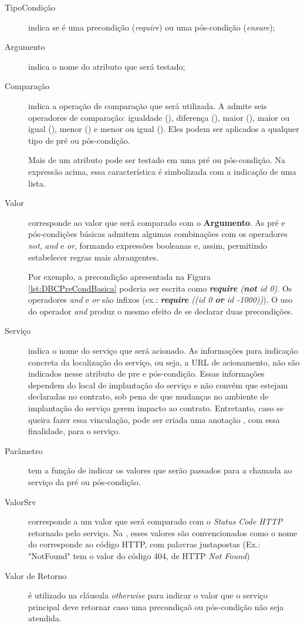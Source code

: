 \begin{description}
\item [TipoCondição] indica se é uma precondição (\emph{require}) ou uma
pós-condição (\emph{ensure});

\item [Argumento] indica o nome do atributo que será testado;

\item [Comparação] indica a operação de comparação que será utilizada. A
\neoidl{}  admite seis operadores de comparação: igualdade (\literal{==}), 
diferença (\literal{<>}), maior (\literal{>}), maior ou igual (\literal{>=}), 
menor (\literal{<}) e menor ou igual (\literal{<=}). Eles podem ser aplicados  a
qualquer tipo de pré ou pós-condição.

Mais de um atributo pode ser testado em uma pré ou pós-condição. Na expressão
acima, essa característica é simbolizada com a indicação de uma lista.

\item [Valor] corresponde ao valor que será comparado com o \textbf{Argumento}.
As pré e pós-condições básicas admitem algumas combinações com os operadores
\emph{not}, \emph{and} e \emph{or}, formando expressões booleanas e,
assim, permitindo estabelecer regras mais abrangentes.

Por exemplo, a precondição apresentada na Figura \ref{lst:DBCPreCondBasica} poderia
ser escrita como \emph{\textbf{require} (\textbf{not} id \literal{<=} 0)}. Os
operadores \emph{and} e \emph{or} são infixos (ex.: \emph{\textbf{require}
((id \literal{>} 0 \textbf{or} id \literal{<=} -1000))}). O uso do operador
\emph{and} produz o mesmo efeito de se declarar duas precondições.

\item [Serviço] indica o nome do serviço que será acionado. As informações para
indicação concreta da localização do serviço, ou seja, a URL de acionamento, não
são indicados nesse atributo de pre e pós-condição. Essas informações dependem
do local de implantação do serviço e não convém que estejam declaradas no
contrato, sob pena de que mudanças no ambiente de implantação do serviço gerem
impacto ao contrato.
Entretanto, caso se queira fazer essa vinculação, pode ser criada uma anotação
\neoidl{}, com essa finalidade, para o serviço.

\item [Parâmetro] tem a função de indicar os valores que serão passados para a
chamada ao serviço da pré ou pós-condição.

 \item [ValorSrv] corresponde a um valor que será comparado com o
 \textit{Status Code HTTP} retornado pelo serviço. Na \neoidl{}, esses valores
 são convencionados como o nome do corresponde ao código HTTP, com palavras
 justapostas (Ex.: "NotFound" tem o valor do código 404, de HTTP \textit{Not
 Found})

\item [Valor de Retorno] é utilizado na cláusula \emph{otherwise} para indicar o
valor que o serviço principal deve retornar caso uma precondiçaõ ou pós-condição
não seja atendida.

\end{description}


